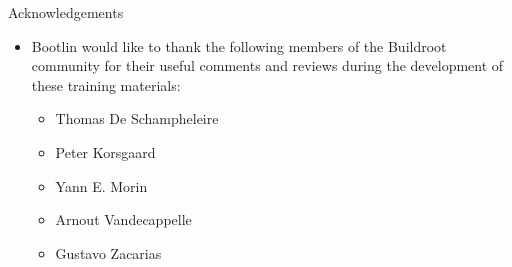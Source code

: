 \begin{frame}{Acknowledgements}

  \begin{itemize}

  \item Bootlin would like to thank the following members of
    the Buildroot community for their useful comments and reviews
    during the development of these training materials:
    \begin{itemize}
    \item Thomas De Schampheleire
    \item Peter Korsgaard
    \item Yann E. Morin
    \item Arnout Vandecappelle
    \item Gustavo Zacarias
    \end{itemize}
  \end{itemize}

\end{frame}
